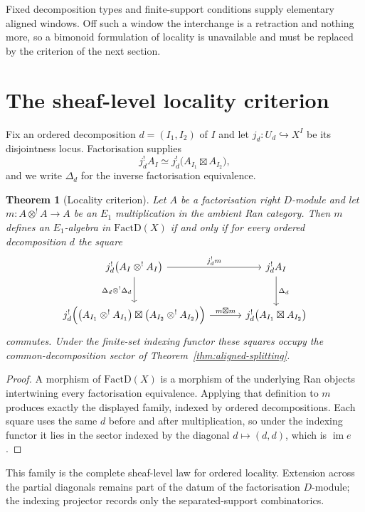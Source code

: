 \documentclass[11pt,reqno]{amsart}
\newtheorem{theorem}{Theorem}[section]
\theoremstyle{definition}
\theoremstyle{remark}
\providecommand{\FactD}{\mathrm{FactD}}
\begin{document}
Fixed decomposition types and finite-support conditions supply elementary
aligned windows. Off such a window the interchange is a retraction and
nothing more, so a bimonoid formulation of locality is unavailable and
must be replaced by the criterion of the next section.

\section{The sheaf-level locality criterion}

Fix an ordered decomposition $d=(I_1,I_2)$ of $I$ and let
$j_d\colon U_d\hookrightarrow X^I$ be its disjointness locus.
Factorisation supplies
\[
  j_d^!A_I \simeq j_d^!\bigl(A_{I_1}\boxtimes A_{I_2}\bigr),
\]
and we write $\Delta_d$ for the inverse factorisation equivalence.

\begin{theorem}[Locality criterion]
\label{thm:locality}
Let $A$ be a factorisation right $D$-module and let
$m\colon A\otimes^! A\to A$ be an $E_1$ multiplication in the ambient Ran
category. Then $m$ defines an $E_1$-algebra in $\FactD(X)$ if and only if
for every ordered decomposition $d$ the square
\[
\begin{tikzcd}[column sep=3.2em, row sep=2.6em]
j_d^!\bigl(A_I\otimes^! A_I\bigr)
  \arrow[r, "j_d^!m"]
  \arrow[d, "\Delta_d\otimes^!\Delta_d"']
& j_d^!A_I \arrow[d, "\Delta_d"] \\
j_d^!\Bigl(\bigl(A_{I_1}\otimes^! A_{I_1}\bigr)\boxtimes
           \bigl(A_{I_2}\otimes^! A_{I_2}\bigr)\Bigr)
  \arrow[r, "m\boxtimes m"]
& j_d^!\bigl(A_{I_1}\boxtimes A_{I_2}\bigr)
\end{tikzcd}
\]
commutes. Under the finite-set indexing functor these squares occupy the
common-decomposition sector of Theorem~\ref{thm:aligned-splitting}.
\end{theorem}

\begin{proof}
A morphism of $\FactD(X)$ is a morphism of the underlying Ran objects
intertwining every factorisation equivalence. Applying that definition to
$m$ produces exactly the displayed family, indexed by ordered
decompositions. Each square uses the same $d$ before and after
multiplication, so under the indexing functor it lies in the sector
indexed by the diagonal $d\mapsto(d,d)$, which is
$\operatorname{im}e$.
\end{proof}

This family is the complete sheaf-level law for ordered locality.
Extension across the partial diagonals remains part of the datum of the
factorisation $D$-module; the indexing projector records only the
separated-support combinatorics.
\end{document}
